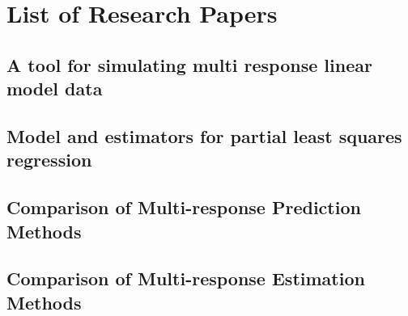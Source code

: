 \documentclass[11pt,twoside,openright,titlepage,
  headinclude,footinclude,BCOR=5mm,
  numbers=noenddot,cleardoublepage=empty,
  tablecaptionabove, dottedtoc,
  bibliography=totoc,paper=a4]{scrreprt}
\begin{document}
\hypertarget{refs}{}

  \renewcommand\bibname{References}
  


\nocite{*}

\appendix
\part*{List of Research Papers}
\par\chapter{A tool for simulating multi response linear model data}
\cleardoublepage
%

\par\chapter{Model and estimators for partial least squares regression}
\cleardoublepage
%

\par\chapter{Comparison of Multi-response Prediction Methods}
\cleardoublepage
%

\par\chapter{Comparison of Multi-response Estimation Methods}
\cleardoublepage
%


\end{document}
